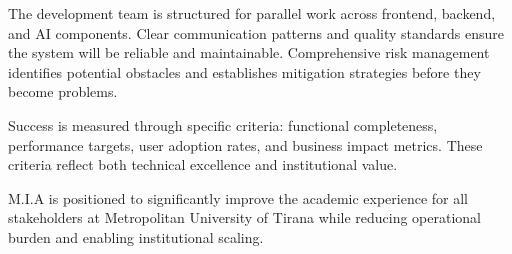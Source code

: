 \documentclass[12pt,a4paper]{report}
\begin{document}
The development team is structured for parallel work across frontend, backend, and AI components. Clear communication patterns and quality standards ensure the system will be reliable and maintainable. Comprehensive risk management identifies potential obstacles and establishes mitigation strategies before they become problems.

Success is measured through specific criteria: functional completeness, performance targets, user adoption rates, and business impact metrics. These criteria reflect both technical excellence and institutional value.

M.I.A is positioned to significantly improve the academic experience for all stakeholders at Metropolitan University of Tirana while reducing operational burden and enabling institutional scaling.
\end{document}
